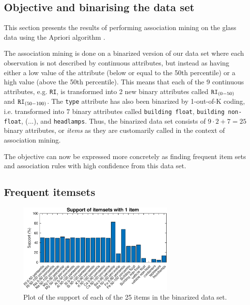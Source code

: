 \subsection{Objective and binarising the data set}
This section presents the results of performing association mining on the glass data using the Apriori algorithm \cite[Section 19, algorithm 8]{coursenotes}.

The association mining is done on a binarized version of our data set where each observation is not described by continuous attributes, but instead as having either a low value of the attribute (below or equal to the 50th percentile) or a high value (above the 50th percentile). This means that each of the 9 continuous attributes, e.g. \texttt{RI}, is transformed into 2 new binary attributes called $\texttt{RI}_{(0-50)}$ and $\texttt{RI}_{(50-100)}$. The \texttt{type} attribute has also been binarized by 1-out-of-K coding, i.e. transformed into 7 binary attributes called \texttt{building float}, \texttt{building non-float}, (...), and \texttt{headlamps}. Thus, the binarized data set consists of $9\cdot2 + 7 = 25$ binary attributes, or \textit{items} as they are customarily called in the context of association mining.

The objective can now be expressed more concretely as finding frequent item sets and association rules with high confidence from this data set. %

\subsection{Frequent itemsets}


\begin{figure}[H]
    \centering
    \includegraphics[width = 0.7\textwidth]{fig/freq-items-plot.eps}
    \caption{Plot of the support of each of the 25 items in the binarized data set.}
    \label{fig:freq-items-plot}
\end{figure}

